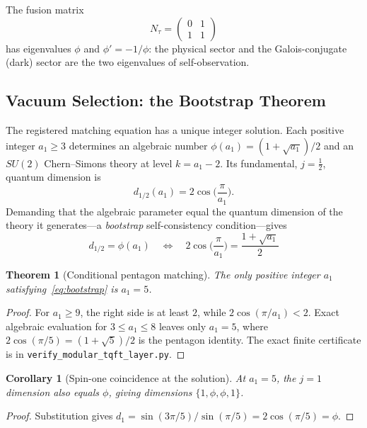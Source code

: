 \documentclass[12pt,a4paper]{article}
\newtheorem{theorem}{Theorem}
\newtheorem{corollary}{Corollary}
\theoremstyle{definition}
\begin{document}
The fusion matrix
\[
N_\tau = \begin{pmatrix} 0 & 1 \\ 1 & 1 \end{pmatrix}
\]
has eigenvalues $\phi$ and $\phi' = -1/\phi$: the physical sector and the Galois-conjugate (dark) sector are the two eigenvalues of self-observation.

\subsection{Vacuum Selection: the Bootstrap Theorem}
\label{sec:bootstrap}

The registered matching equation has a unique integer solution.  Each positive integer $a_1 \ge 3$ determines an algebraic number $\phi(a_1) = (1 + \sqrt{a_1})/2$ and an $SU(2)$ Chern--Simons theory at level $k = a_1 - 2$.  Its fundamental, $j=\tfrac12$, quantum dimension is
\begin{equation}
d_{1/2}(a_1) = 2\cos\!\Big(\frac{\pi}{a_1}\Big).
\end{equation}
Demanding that the algebraic parameter equal the quantum dimension of the theory it generates---a \emph{bootstrap} self-consistency condition---gives
\begin{equation}
\label{eq:bootstrap}
\boxed{d_{1/2} = \phi(a_1) \quad\Longleftrightarrow\quad 2\cos\!\Big(\frac{\pi}{a_1}\Big) = \frac{1+\sqrt{a_1}}2}
\end{equation}

\begin{theorem}[Conditional pentagon matching]
\label{thm:bootstrap}
The only positive integer $a_1$ satisfying~\eqref{eq:bootstrap} is $a_1 = 5$.
\end{theorem}

\begin{proof}
For $a_1\ge9$, the right side is at least $2$, while $2\cos(\pi/a_1)<2$.  Exact algebraic evaluation for $3\le a_1\le8$ leaves only $a_1=5$, where $2\cos(\pi/5)=(1+\sqrt5)/2$ is the pentagon identity.  The exact finite certificate is in \texttt{verify\_modular\_tqft\_layer.py}.
\end{proof}

\begin{corollary}[Spin-one coincidence at the solution]
\label{cor:double}
At $a_1=5$, the $j=1$ dimension also equals $\phi$, giving dimensions $\{1,\phi,\phi,1\}$.
\end{corollary}

\begin{proof}
Substitution gives \(d_1=\sin(3\pi/5)/\sin(\pi/5)=2\cos(\pi/5)=\phi\).
\end{proof}
\end{document}
